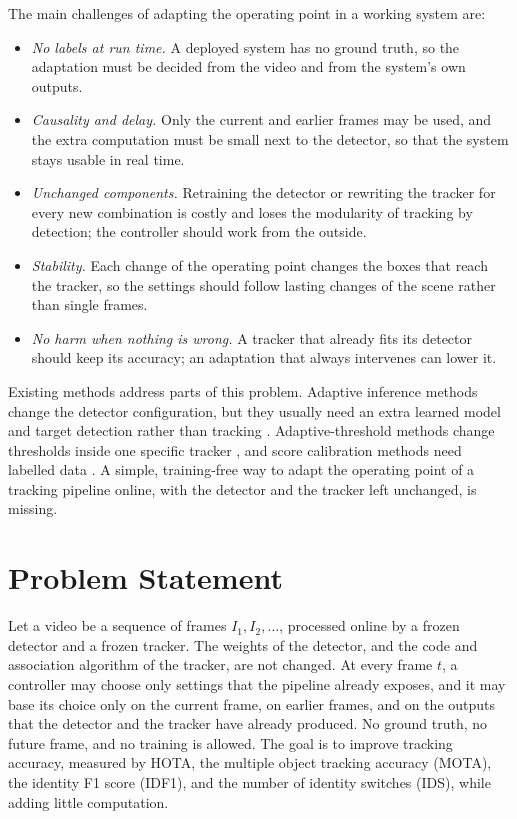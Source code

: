 The main challenges of adapting the operating point in a working system are:
\begin{itemize}
\item \emph{No labels at run time.} A deployed system has no ground truth, so the adaptation must be decided from the video and from the system's own outputs.
\item \emph{Causality and delay.} Only the current and earlier frames may be used, and the extra computation must be small next to the detector, so that the system stays usable in real time.
\item \emph{Unchanged components.} Retraining the detector or rewriting the tracker for every new combination is costly and loses the modularity of tracking by detection; the controller should work from the outside.
\item \emph{Stability.} Each change of the operating point changes the boxes that reach the tracker, so the settings should follow lasting changes of the scene rather than single frames.
\item \emph{No harm when nothing is wrong.} A tracker that already fits its detector should keep its accuracy; an adaptation that always intervenes can lower it.
\end{itemize}

Existing methods address parts of this problem. Adaptive inference methods change the detector configuration, but they usually need an extra learned model and target detection rather than tracking \cite{chin2019adascale,xu2020approxdet,jiang2018chameleon}. Adaptive-threshold methods change thresholds inside one specific tracker \cite{ma2023adaptivebytetrack,shim2024adaptrack,act2026adaptive}, and score calibration methods need labelled data \cite{kuppers2020detcalib}. A simple, training-free way to adapt the operating point of a tracking pipeline online, with the detector and the tracker left unchanged, is missing.

\section{Problem Statement}\label{sec:intro-problem}
Let a video be a sequence of frames $I_1, I_2, \dots$, processed online by a frozen detector and a frozen tracker. The weights of the detector, and the code and association algorithm of the tracker, are not changed. At every frame $t$, a controller may choose only settings that the pipeline already exposes, and it may base its choice only on the current frame, on earlier frames, and on the outputs that the detector and the tracker have already produced. No ground truth, no future frame, and no training is allowed. The goal is to improve tracking accuracy, measured by HOTA, the multiple object tracking accuracy (MOTA), the identity F1 score (IDF1), and the number of identity switches (IDS), while adding little computation.


